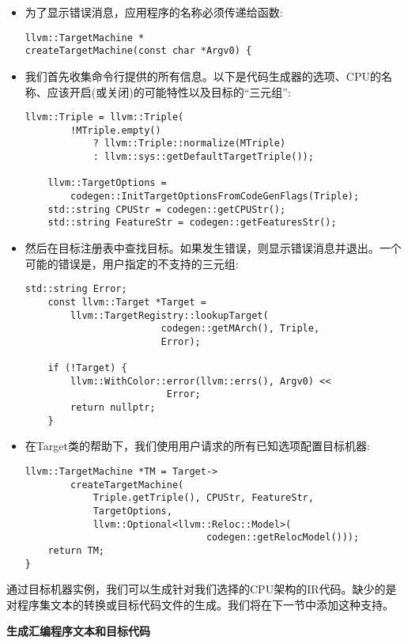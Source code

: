 \begin{itemize}
\item 为了显示错误消息，应用程序的名称必须传递给函数:
\begin{lstlisting}[caption={}]
llvm::TargetMachine *
createTargetMachine(const char *Argv0) {
\end{lstlisting}

\item 我们首先收集命令行提供的所有信息。以下是代码生成器的选项、CPU的名称、应该开启(或关闭)的可能特性以及目标的“三元组”:
\begin{lstlisting}[caption={}]
	llvm::Triple = llvm::Triple(
		!MTriple.empty()
			? llvm::Triple::normalize(MTriple)
			: llvm::sys::getDefaultTargetTriple());
			
	llvm::TargetOptions =
		codegen::InitTargetOptionsFromCodeGenFlags(Triple);
	std::string CPUStr = codegen::getCPUStr();
	std::string FeatureStr = codegen::getFeaturesStr();
\end{lstlisting}

\item 然后在目标注册表中查找目标。如果发生错误，则显示错误消息并退出。一个可能的错误是，用户指定的不支持的三元组:
\begin{lstlisting}[caption={}]
	std::string Error;
	const llvm::Target *Target =
		llvm::TargetRegistry::lookupTarget(
						codegen::getMArch(), Triple,
						Error);
	
	if (!Target) {
		llvm::WithColor::error(llvm::errs(), Argv0) <<
						 Error;
		return nullptr;
	}
\end{lstlisting}

\item 在Target类的帮助下，我们使用用户请求的所有已知选项配置目标机器:
\begin{lstlisting}[caption={}]
	llvm::TargetMachine *TM = Target->
		createTargetMachine(
			Triple.getTriple(), CPUStr, FeatureStr,
			TargetOptions,
			llvm::Optional<llvm::Reloc::Model>(
								codegen::getRelocModel()));
	return TM;
}
\end{lstlisting}

\end{itemize}

通过目标机器实例，我们可以生成针对我们选择的CPU架构的IR代码。缺少的是对程序集文本的转换或目标代码文件的生成。我们将在下一节中添加这种支持。\par

\hspace*{\fill} \par %
\textbf{生成汇编程序文本和目标代码}

